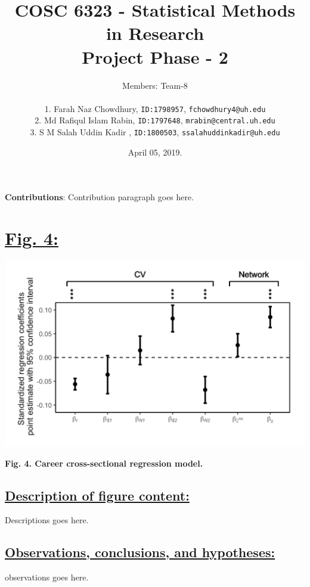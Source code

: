 \documentclass{article}\usepackage[]{graphicx}\usepackage[]{color}
\title{COSC 6323 - Statistical Methods in Research\\Project Phase - 2\\}
\author{%
    Members: Team-8 \\\\
    1. Farah Naz Chowdhury,    \texttt{ID:1798957}, \texttt{fchowdhury4@uh.edu}      \vspace{2pt} \\
    2. Md Rafiqul Islam Rabin, \texttt{ID:1797648}, \texttt{mrabin@central.uh.edu}   \vspace{2pt} \\
    3. S M Salah Uddin Kadir , \texttt{ID:1800503}, \texttt{ssalahuddinkadir@uh.edu} \vspace{2pt} \\
}
\date{April 05, 2019.}
\begin{document}
\maketitle
\par{\textbf{Contributions}: Contribution paragraph goes here.}

\newpage
\section*{\underline{Fig. 4:}}
\begin{center}
\includegraphics[scale=1.0]{4.png}
\newline
\par{\textbf{Fig. 4. Career cross-sectional regression model.}}
\end{center}
\subsection*{\underline{Description of figure content:}}
\par{
Descriptions goes here.
}
\subsection*{\underline{Observations, conclusions, and hypotheses:}}
\par{
observations goes here.
}

\newpage
\end{document}
